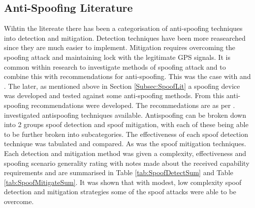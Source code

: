 %
%

\subsection{Anti-Spoofing Literature}
Wihtin the litereate there has been a categorisation of anti-spoofing techniques into detection and mitigation. Detection techniques have been more reasearched since they
are much easier to implement. Mitigation requires overcoming the spoofing attack and maintaining lock with the legitimate GPS signals.
It is common within research to investigate methods of spoofing attack and to combine this with recommendations for anti-spoofing. This was the case with \textcite{RN6}
and \textcite{RN23}. The later, as mentioned above in Section \ref{Subsec:SpoofLit} a spoofing device was developed and tested against some anti-spoofing methods. From
this anti-spoofing recommendations were developed. The recommedations are as per \citeauthor{RN6}. \textcite{RN6} investigated antispoofing techniques available.
Antispoofing can be broken down into 2 groups spoof detection and spoof mitigation, with each of these being able to be further broken into subcategories. The
effectiveness of each spoof detection technique was tabulated and compared. As was the spoof mitigation techniques. Each detection and mitigation method was given a
complexity, effectiveness and spoofing scenario generality rating with notes made about the received capability requirements and are summarised in Table
\ref{tab:SpoofDetectSum} and Table \ref{tab:SpoofMitigateSum}. It was shown that with modest, low complexity spoof detection and mitigation strategies some of the spoof
attacks were able to be overcome.

